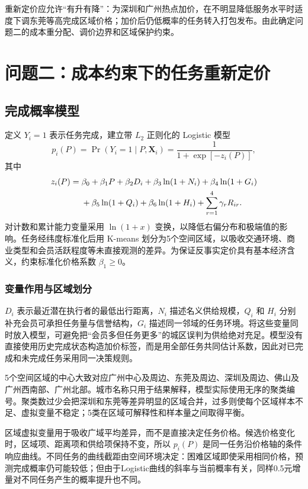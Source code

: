 ﻿\documentclass[UTF8,zihao=-4,a4paper,fontset=fandol]{ctexart}
\begin{document}
重新定价应允许“有升有降”：为深圳和广州热点加价，在不明显降低服务水平时适度下调东莞等高完成区域价格；加价后仍低概率的任务转入打包发布。由此确定问题二的成本重分配、调价边界和区域保护约束。

\section{问题二：成本约束下的任务重新定价}

\subsection{完成概率模型}

定义 $Y_i=1$ 表示任务完成，建立带 $L_2$ 正则化的 Logistic 模型
\begin{equation}
p_i(P)=\Pr(Y_i=1\mid P,\bm X_i)
=\frac{1}{1+\exp[-z_i(P)]},
\label{eq:logistic}
\end{equation}
其中
\begin{align}
z_i(P)=\;&\beta_0+\beta_1P+\beta_2D_i
+\beta_3\ln(1+N_i)+\beta_4\ln(1+G_i)\notag\\
&+\beta_5\ln(1+Q_i)+\beta_6\ln(1+H_i)
+\sum_{r=1}^{4}\gamma_rR_{ir}.
\label{eq:linear-predictor}
\end{align}
对计数和累计能力变量采用 $\ln(1+x)$ 变换，以降低右偏分布和极端值的影响。任务经纬度标准化后用 K-means 划分为5个空间区域，以吸收交通环境、商业类型和会员活跃程度等未直接观测的差异\cite{macqueen1967}。为保证反事实定价具有基本经济含义，约束标准化价格系数 $\beta_1\ge0$。

\subsubsection{变量作用与区域划分}

$D_i$ 表示最近潜在执行者的最低出行距离，$N_i$ 描述名义供给规模，$Q_i$ 和 $H_i$ 分别补充会员可承担任务量与信誉结构，$G_i$ 描述同一邻域的任务环境。将这些变量同时放入模型，可避免把“会员多但任务更多”的城区误判为供给绝对充足。模型没有直接使用历史完成状态构造加价标签，而是用全部任务共同估计系数，因此对已完成和未完成任务采用同一决策规则。

5个空间区域的中心大致对应广州中心及周边、东莞及周边、深圳及周边、佛山及广州西南部、广州北部。城市名称只用于结果解释，模型实际使用无序的聚类编号。聚类数过少会把深圳和东莞等差异明显的区域合并，过多则使每个区域样本不足、虚拟变量不稳定；5类在区域可解释性和样本量之间取得平衡。

区域虚拟变量用于吸收广域平均差异，而不是直接决定任务价格。候选价格变化时，区域项、距离项和供给项保持不变，所以 $p_i(P)$ 是同一任务沿价格轴的条件响应曲线。不同任务的曲线截距由空间环境决定：困难区域即使采用相同价格，预测完成概率仍可能较低；但由于Logistic曲线的斜率与当前概率有关，同样0.5元增量对不同任务产生的概率提升也不同。
\end{document}
